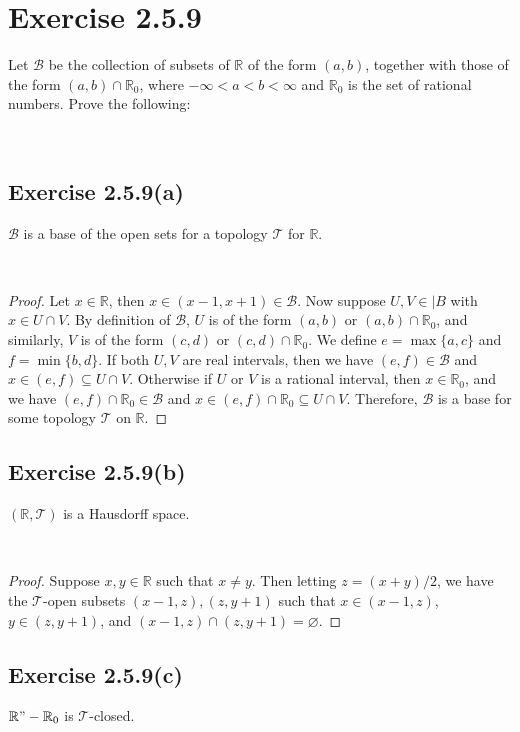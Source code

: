 \documentclass[12pt]{article}
\newenvironment{problem}
    {\begin{lrbox}{\mybox}\begin{minipage}{\textwidth-10pt}}
    {\end{minipage}\end{lrbox}\framebox[6.5in]{\usebox{\mybox}}\\}
\newcommand{\R}{\mathbb{R}}
\let\emptyset\varnothing
\newcommand{\T}{\mathscr{T}}
\newcommand{\B}{\mathscr{B}}
\begin{document}
\section*{Exercise 2.5.9}
\begin{problem}
    Let $\B$ be the collection of subsets of $\R$ of the form $(a,b)$, together with those of the form $(a,b)\cap\R_0$, where $-\infty<a<b<\infty$ and $\R_0$ is the set of rational numbers. Prove the following:
\end{problem}

\subsection*{Exercise 2.5.9(a)}
\begin{problem}
    $\B$ is a base of the open sets for a topology $\T$ for $\R$.
\end{problem}

\begin{proof}
    Let $x\in\R$, then $x\in(x-1,x+1)\in\B$. Now suppose $U,V\in|B$ with $x\in U\cap V$. By definition of $\B$, $U$ is of the form $(a,b)$ or $(a,b)\cap\R_0$, and similarly, $V$ is of the form $(c,d)$ or $(c,d)\cap\R_0$. We define $e=\max\{a,c\}$ and $f=\min\{b,d\}$. If both $U,V$ are real intervals, then we have $(e,f)\in\B$ and $x\in(e,f) \subseteq U\cap V$. Otherwise if $U$ or $V$ is a rational interval, then $x\in\R_0$, and we have $(e,f)\cap\R_0\in\B$ and $x\in(e,f)\cap\R_0 \subseteq U\cap V$. Therefore, $\B$ is a base for some topology $\T$ on $\R$. 
    
\end{proof}

\subsection*{Exercise 2.5.9(b)}
\begin{problem}
    $(\R,\T)$ is a Hausdorff space.
\end{problem}

\begin{proof}
    Suppose $x,y\in\R$ such that $x\ne y$. Then letting $z=(x+y)/2$, we have the $\T$-open subsets $(x-1,z),(z,y+1)$ such that $x\in(x-1,z)$, $y\in(z,y+1)$, and $(x-1,z)\cap(z,y+1)=\emptyset$. 
    
\end{proof}

\subsection*{Exercise 2.5.9(c)}
\begin{problem}
    $\R"-\R_0$ is $\T$-closed.
\end{problem}
\end{document}

